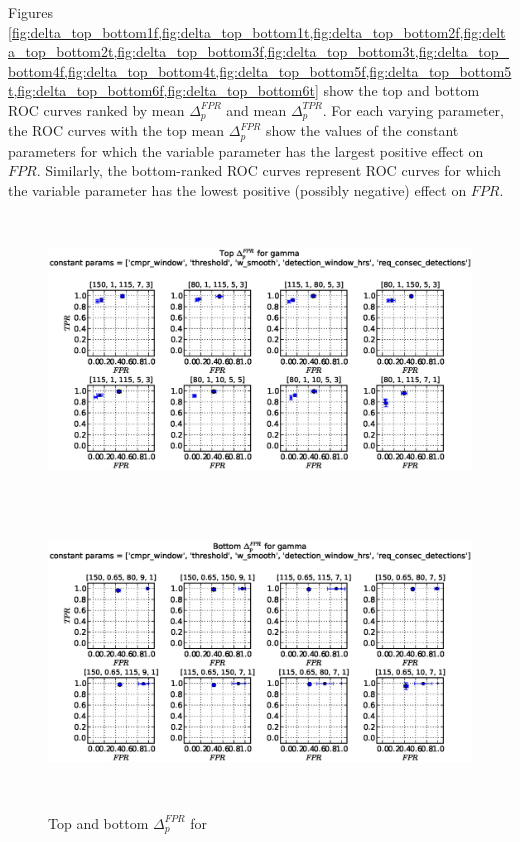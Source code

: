 \newpage
Figures \ref{fig:delta_top_bottom1f,fig:delta_top_bottom1t,fig:delta_top_bottom2f,fig:delta_top_bottom2t,fig:delta_top_bottom3f,fig:delta_top_bottom3t,fig:delta_top_bottom4f,fig:delta_top_bottom4t,fig:delta_top_bottom5f,fig:delta_top_bottom5t,fig:delta_top_bottom6f,fig:delta_top_bottom6t} show the top and bottom ROC curves ranked by mean $\Delta_p^{FPR}$ and mean $\Delta_p^{TPR}$. For each varying parameter, the ROC curves with the top mean $\Delta_p^{FPR}$ show the values of the constant parameters for which the variable parameter has the largest positive effect on $FPR$. Similarly, the bottom-ranked ROC curves represent ROC curves for which the variable parameter has the lowest positive (possibly negative) effect on $FPR$.

\begin{figure}[!h]
\begin{center}
\includegraphics[height=3in]{../fig/final/top_fpr/gamma}
\includegraphics[height=3in]{../fig/final/bottom_fpr/gamma}
\end{center}
\caption{\label{fig:delta_top_bottom1f} Top and bottom $\Delta_p^{FPR}$ for }
\end{figure}


